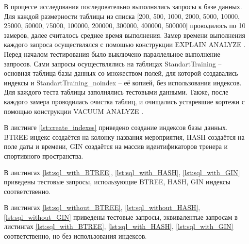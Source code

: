 В процессе исследования последовательно выполнялись запросы к базе данных. Для каждой размерности таблицы из
списка [200, 500, 1000, 2000, 5000, 10000, 25000, 50000, 75000, 100000, 200000, 300000, 400000, 500000] проводилось по 10
замеров, далее считалось среднее время выполнения. Замер времени выполнения каждого запроса осуществлялся с помощью 
конструкции EXPLAIN ANALYZE \cite{pg-explain}. Перед началом тестирования было выключено параллельное выполнение запросов. 
Сами запросы осуществлялись на таблицах StandartTraining -- основная таблица базы данных со множеством полей, для которой создавались индексы и 
StandartTraining\_noindex -- её копией, без использования индексов. Для каждого теста таблицы заполнялись тестовыми данными.
Также, после каждого замера проводилась очистка таблиц, и очищались устаревшие кортежи с помощью конструкции VACUUM ANALYZE \cite{pg-vacuum}. 

В листинге \ref{lst:create_indexes} приведено создание индексов базы данных. BTREE индекс создаётся на колонку названия мероприятия,
HASH создаётся на поле даты и времени, GIN создаётся на массив идентификаторов тренера и спортивного пространства.





В листингах \ref{lst:sql_with_BTREE}, \ref{lst:sql_with_HASH}, \ref{lst:sql_with_GIN} приведены тестовые запросы, использующие BTREE, HASH, GIN индексы соответственно.







В листингах \ref{lst:sql_without_BTREE}, \ref{lst:sql_without_HASH}, \ref{lst:sql_without_GIN} приведены тестовые запросы, эквивалентые
запросам в листингах \ref{lst:sql_with_BTREE}, \ref{lst:sql_with_HASH}, \ref{lst:sql_with_GIN} соответственно, но без использования индексов.



